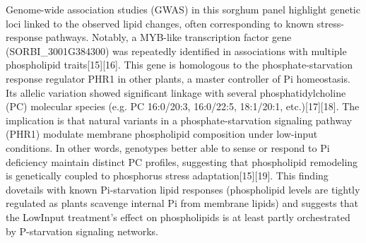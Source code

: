 \documentclass[10pt,letterpaper]{article}
\begin{document}
\begin{itemize}
Genome-wide association studies (GWAS) in this sorghum panel highlight genetic loci linked to the observed lipid changes, often corresponding to known stress-response pathways. Notably, a MYB-like transcription factor gene (SORBI\_3001G384300) was repeatedly identified in associations with multiple phospholipid traits[15][16]. This gene is homologous to the phosphate-starvation response regulator PHR1 in other plants, a master controller of Pi homeostasis. Its allelic variation showed significant linkage with several phosphatidylcholine (PC) molecular species (e.g. PC 16:0/20:3, 16:0/22:5, 18:1/20:1, etc.)[17][18]. The implication is that natural variants in a phosphate-starvation signaling pathway (PHR1) modulate membrane phospholipid composition under low-input conditions. In other words, genotypes better able to sense or respond to Pi deficiency maintain distinct PC profiles, suggesting that phospholipid remodeling is genetically coupled to phosphorus stress adaptation[15][19]. This finding dovetails with known Pi-starvation lipid responses (phospholipid levels are tightly regulated as plants scavenge internal Pi from membrane lipids) and suggests that the LowInput treatment’s effect on phospholipids is at least partly orchestrated by P-starvation signaling networks.


\end{itemize}
\end{document}
